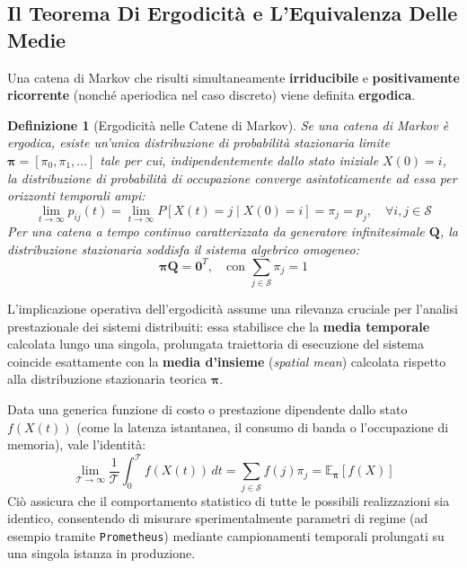 \documentclass[11pt, a4paper]{article}
\newtheorem{theorem}{Definizione}
\begin{document}
\subsection{Il Teorema Di Ergodicità e L'Equivalenza Delle Medie}

Una catena di Markov che risulti simultaneamente \textbf{irriducibile} e \textbf{positivamente ricorrente} (nonché aperiodica nel caso discreto) viene definita \textbf{ergodica}.

\begin{theorem}[Ergodicità nelle Catene di Markov]
Se una catena di Markov è ergodica, esiste un'unica distribuzione di probabilità stazionaria limite $\bm{\pi} = [\pi_0, \pi_1, \dots]$ tale per cui, indipendentemente dallo stato iniziale $X(0) = i$, la distribuzione di probabilità di occupazione converge asintoticamente ad essa per orizzonti temporali ampi:
\[
    \lim_{t \to \infty} p_{ij}(t) = \lim_{t \to \infty} P[X(t) = j \mid X(0) = i] = \pi_j = p_j, \quad \forall i, j \in \mathcal{S}
\]
Per una catena a tempo continuo caratterizzata da generatore infinitesimale $\bm{Q}$, la distribuzione stazionaria soddisfa il sistema algebrico omogeneo:
\[
    \boxed{\bm{\pi} \bm{Q} = \bm{0}^T, \quad \text{con } \sum_{j \in \mathcal{S}} \pi_j = 1}
\]
\end{theorem}

L'implicazione operativa dell'ergodicità assume una rilevanza cruciale per l'analisi prestazionale dei sistemi distribuiti: essa stabilisce che la \textbf{media temporale} calcolata lungo una singola, prolungata traiettoria di esecuzione del sistema coincide esattamente con la \textbf{media d'insieme} (\emph{spatial mean}) calcolata rispetto alla distribuzione stazionaria teorica $\bm{\pi}$.

Data una generica funzione di costo o prestazione dipendente dallo stato $f(X(t))$ (come la latenza istantanea, il consumo di banda o l'occupazione di memoria), vale l'identità:
\[
    \boxed{\lim_{\mathcal{T} \to \infty} \frac{1}{\mathcal{T}} \int_0^{\mathcal{T}} f(X(t))\,dt = \sum_{j \in \mathcal{S}} f(j) \pi_j = \mathbb{E}_{\bm{\pi}}[f(X)]}
\]
Ciò assicura che il comportamento statistico di tutte le possibili realizzazioni sia identico, consentendo di misurare sperimentalmente parametri di regime (ad esempio tramite \texttt{Prometheus}) mediante campionamenti temporali prolungati su una singola istanza in produzione.

\newpage

\end{document}
